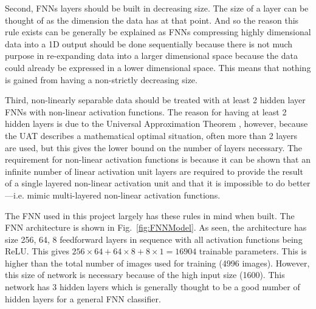 \documentclass[a4paper,fleqn,usenatbib]{mnras}
\begin{document}
Second, FNNs layers should be built in decreasing size. The size of a layer can be thought of as the dimension the data has at that point. And so the reason this rule exists can be generally be explained as FNNs compressing highly dimensional data into a 1D output should be done sequentially because there is not much purpose in re-expanding data into a larger dimensional space because the data could already be expressed in a lower dimensional space. This means that nothing is gained from having a non-strictly decreasing size. 

Third, non-linearly separable data should be treated with at least 2 hidden layer FNNs with non-linear activation functions. The reason for having at least 2 hidden layers is due to the Universal Approximation Theorem \cite{UniversalApproximationTheorem}, however, because the UAT describes a mathematical optimal situation, often more than 2 layers are used, but this gives the lower bound on the number of layers necessary. The requirement for non-linear activation functions is because it can be shown that an infinite number of linear activation unit layers are required to provide the result of a single layered non-linear activation unit and that it is impossible to do better---i.e. mimic multi-layered non-linear activation functions.

The FNN used in this project largely has these rules in mind when built. The FNN architecture is shown in Fig.~\ref{fig:FNNModel}. As seen, the architecture has size 256, 64, 8 feedforward layers in sequence with all activation functions being ReLU. This gives $256\times 64+64\times 8 +8\times 1 = 16904$ trainable parameters. This is higher than the total number of images used for training (4996 images).  However, this size of network is necessary because of the high input size (1600). This network has 3 hidden layers which is generally thought to be a good number of hidden layers for a general FNN classifier. 
\end{document}
